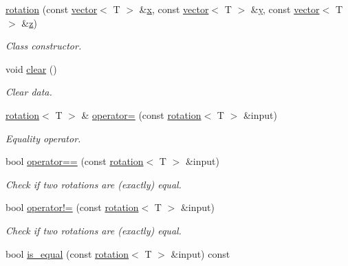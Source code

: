 \begin{DoxyCompactItemize}
\hyperlink{classddd_1_1rotation_a2b0e5637ae25ce6fc706f50d49f885e7}{rotation} (const \hyperlink{classddd_1_1vector}{vector}$<$ T $>$ \&\hyperlink{classddd_1_1rotation_a6888d588f65756080db76224a262140b}{x}, const \hyperlink{classddd_1_1vector}{vector}$<$ T $>$ \&\hyperlink{classddd_1_1rotation_a9abadbab25e48775a4dd73c43f9d03ac}{y}, const \hyperlink{classddd_1_1vector}{vector}$<$ T $>$ \&\hyperlink{classddd_1_1rotation_a6128afc3f093ba083b2f79b111990ae7}{z})
\begin{DoxyCompactList}\small\item\em Class constructor. \end{DoxyCompactList}\item 
\mbox{\label{classddd_1_1rotation_a2b8d2188a302d730c313dd61bfaacf47}} 
void \hyperlink{classddd_1_1rotation_a2b8d2188a302d730c313dd61bfaacf47}{clear} ()
\begin{DoxyCompactList}\small\item\em Clear data. \end{DoxyCompactList}\item 
\hyperlink{classddd_1_1rotation}{rotation}$<$ T $>$ \& \hyperlink{classddd_1_1rotation_a7ea14405fb6eba57a9cf3de1bc200fd0}{operator=} (const \hyperlink{classddd_1_1rotation}{rotation}$<$ T $>$ \&input)
\begin{DoxyCompactList}\small\item\em Equality operator. \end{DoxyCompactList}\item 
bool \hyperlink{classddd_1_1rotation_ae704ea435ead1c66b7ca0bd4899ce2bc}{operator==} (const \hyperlink{classddd_1_1rotation}{rotation}$<$ T $>$ \&input)
\begin{DoxyCompactList}\small\item\em Check if two rotations are (exactly) equal. \end{DoxyCompactList}\item 
bool \hyperlink{classddd_1_1rotation_abfeae27a919ada418d2cdcce96e5e08d}{operator!=} (const \hyperlink{classddd_1_1rotation}{rotation}$<$ T $>$ \&input)
\begin{DoxyCompactList}\small\item\em Check if two rotations are (exactly) equal. \end{DoxyCompactList}\item 
bool \hyperlink{classddd_1_1rotation_a3af65c771a81cd62655802ce3ee22614}{is\+\_\+equal} (const \hyperlink{classddd_1_1rotation}{rotation}$<$ T $>$ \&input) const

\end{DoxyCompactItemize}
